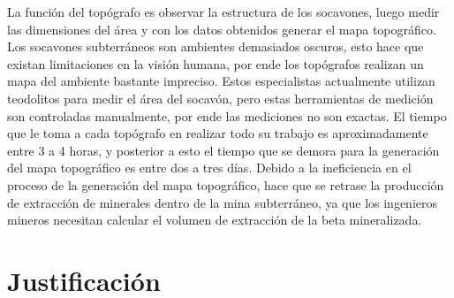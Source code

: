 La función del topógrafo es observar la estructura de los socavones, luego medir las dimensiones del área y con los datos obtenidos generar el mapa topográfico. Los socavones subterráneos son ambientes demasiados oscuros, esto hace que existan  limitaciones en la visión humana, por ende los topógrafos realizan un mapa del ambiente bastante impreciso. Estos especialistas actualmente utilizan teodolitos para medir el área del socavón, pero estas herramientas de medición son controladas manualmente, por ende las mediciones no son exactas. El tiempo que le toma a cada topógrafo en realizar todo su trabajo es aproximadamente entre 3 a 4 horas, y posterior a esto el tiempo que se demora para la generación del mapa topográfico es entre dos a tres días. Debido a la ineficiencia en el proceso de la generación del mapa topográfico, hace que se retrase la producción de extracción de minerales dentro de la mina subterráneo, ya que los ingenieros mineros necesitan calcular el volumen de extracción de la beta mineralizada.



\section{Justificación}




